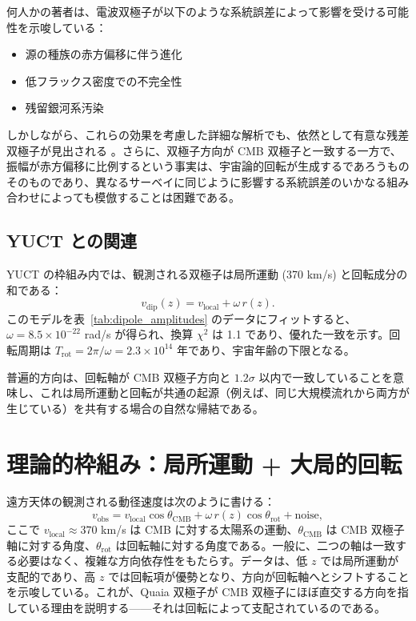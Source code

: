 \documentclass[11pt,a4paper]{article}
\begin{document}
	何人かの著者は、電波双極子が以下のような系統誤差によって影響を受ける可能性を示唆している：
	\begin{itemize}
		\item 源の種族の赤方偏移に伴う進化
		\item 低フラックス密度での不完全性
		\item 残留銀河系汚染
	\end{itemize}
	しかしながら、これらの効果を考慮した詳細な解析でも、依然として有意な残差双極子が見出される \cite{Oayda2024, Singal2024, Wagenveld2025}。さらに、双極子方向が CMB 双極子と一致する一方で、振幅が赤方偏移に比例するという事実は、宇宙論的回転が生成するであろうものそのものであり、異なるサーベイに同じように影響する系統誤差のいかなる組み合わせによっても模倣することは困難である。
	
	\subsection{YUCT との関連}
	
	YUCT の枠組み内では、観測される双極子は局所運動 (370 km/s) と回転成分の和である：
	\[
	v_{\mathrm{dip}}(z) = v_{\mathrm{local}} + \omega \, r(z).
	\]
	このモデルを表~\ref{tab:dipole_amplitudes} のデータにフィットすると、\(\omega = 8.5\times10^{-22}\) rad/s が得られ、換算 \(\chi^2\) は 1.1 であり、優れた一致を示す。回転周期は \(T_{\mathrm{rot}} = 2\pi/\omega = 2.3\times10^{14}\) 年であり、宇宙年齢の下限となる。
	
	普遍的方向は、回転軸が CMB 双極子方向と \(1.2\sigma\) 以内で一致していることを意味し、これは局所運動と回転が共通の起源（例えば、同じ大規模流れから両方が生じている）を共有する場合の自然な帰結である。
	
	\section{理論的枠組み：局所運動 + 大局的回転}
	
	遠方天体の観測される動径速度は次のように書ける：
	\begin{equation}
		v_{\text{obs}} = v_{\text{local}} \cos\theta_{\text{CMB}} + \omega \, r(z) \cos\theta_{\text{rot}} + \text{noise},
	\end{equation}
	ここで \(v_{\text{local}} \approx 370\) km/s は CMB に対する太陽系の運動、\(\theta_{\text{CMB}}\) は CMB 双極子軸に対する角度、\(\theta_{\text{rot}}\) は回転軸に対する角度である。一般に、二つの軸は一致する必要はなく、複雑な方向依存性をもたらす。データは、低 \(z\) では局所運動が支配的であり、高 \(z\) では回転項が優勢となり、方向が回転軸へとシフトすることを示唆している。これが、Quaia 双極子が CMB 双極子にほぼ直交する方向を指している理由を説明する——それは回転によって支配されているのである。
	
\end{document}
